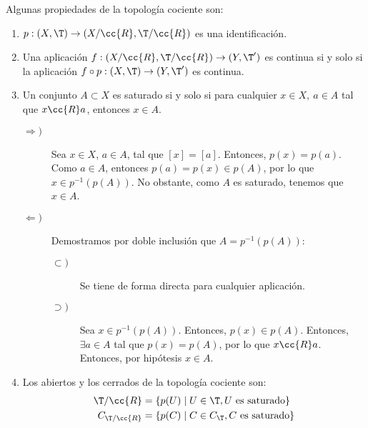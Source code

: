 Algunas propiedades de la topología cociente son:
\begin{enumerate}
    \item $p:(X,\T)\to (X/\cc{R}, \T/\cc{R})$ es una identificación.

    \item Una aplicación $f:(X/\cc{R}, \T/\cc{R})\to (Y,\T')$ es continua si y solo si la aplicación $f\circ p:(X,\T)\to (Y,\T')$ es continua.
    \begin{figure}[H]
        \centering
    \end{figure}

    
    \item Un conjunto $A\subset X$ es saturado si y solo si para cualquier $x\in X,~a\in A$ tal que $x\cc{R}a$, entonces $x\in A$.
    \begin{description}
        \item[$\Longrightarrow)$] Sea $x\in X$, $a\in A$, tal que $[x]=[a]$. Entonces, $p(x)=p(a)$. Como $a\in A$, entonces $p(a)=p(x)\in p(A)$, por lo que $x\in p^{-1}(p(A))$. No obstante, como $A$ es saturado, tenemos que $x\in A$.

        \item[$\Longleftarrow)$] Demostramos por doble inclusión que $A=p^{-1}(p(A))$:
        \begin{description}
            \item[$\subset)$] Se tiene de forma directa para cualquier aplicación.
            \item[$\supset)$] Sea $x\in p^{-1}(p(A))$. Entonces, $p(x)\in p(A)$. Entonces, $\exists a\in A$ tal que $p(x)=p(A)$, por lo que $x\cc{R}a$. Entonces, por hipótesis $x\in A$.
        \end{description}
    \end{description}

    \item Los abiertos y los cerrados de la topología cociente son:
    \begin{equation*}
        \begin{split}
            \T/\cc{R} &= \left\{p(U)\mid U\in \T, U\text{ es saturado}\right\} \\
            C_{\T/\cc{R}} &= \left\{p(C)\mid C\in C_{\T}, C\text{ es saturado}\right\}
        \end{split}
    \end{equation*}
\end{enumerate}

